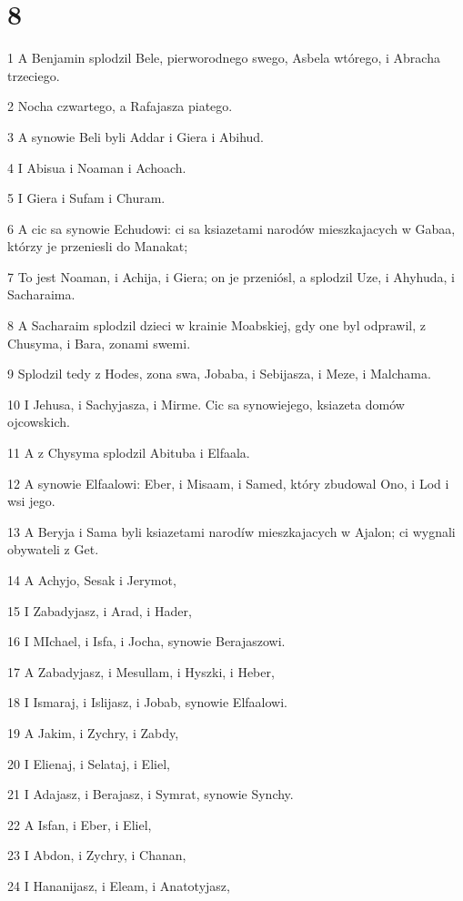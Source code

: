 \chapter{8}

\par 1 A Benjamin splodzil Bele, pierworodnego swego, Asbela wtórego, i Abracha trzeciego.
\par 2 Nocha czwartego, a Rafajasza piatego.
\par 3 A synowie Beli byli Addar i Giera i Abihud.
\par 4 I Abisua i Noaman i Achoach.
\par 5 I Giera i Sufam i Churam.
\par 6 A cic sa synowie Echudowi: ci sa ksiazetami narodów mieszkajacych w Gabaa, którzy je przeniesli do Manakat;
\par 7 To jest Noaman, i Achija, i Giera; on je przeniósl, a splodzil Uze, i Ahyhuda, i Sacharaima.
\par 8 A Sacharaim splodzil dzieci w krainie Moabskiej, gdy one byl odprawil, z Chusyma, i Bara, zonami swemi.
\par 9 Splodzil tedy z Hodes, zona swa, Jobaba, i Sebijasza, i Meze, i Malchama.
\par 10 I Jehusa, i Sachyjasza, i Mirme. Cic sa synowiejego, ksiazeta domów ojcowskich.
\par 11 A z Chysyma splodzil Abituba i Elfaala.
\par 12 A synowie Elfaalowi: Eber, i Misaam, i Samed, który zbudowal Ono, i Lod i wsi jego.
\par 13 A Beryja i Sama byli ksiazetami narodíw mieszkajacych w Ajalon; ci wygnali obywateli z Get.
\par 14 A Achyjo, Sesak i Jerymot,
\par 15 I Zabadyjasz, i Arad, i Hader,
\par 16 I MIchael, i Isfa, i Jocha, synowie Berajaszowi.
\par 17 A Zabadyjasz, i Mesullam, i Hyszki, i Heber,
\par 18 I Ismaraj, i Islijasz, i Jobab, synowie Elfaalowi.
\par 19 A Jakim, i Zychry, i Zabdy,
\par 20 I Elienaj, i Selataj, i Eliel,
\par 21 I Adajasz, i Berajasz, i Symrat, synowie Synchy.
\par 22 A Isfan, i Eber, i Eliel,
\par 23 I Abdon, i Zychry, i Chanan,
\par 24 I Hananijasz, i Eleam, i Anatotyjasz,
